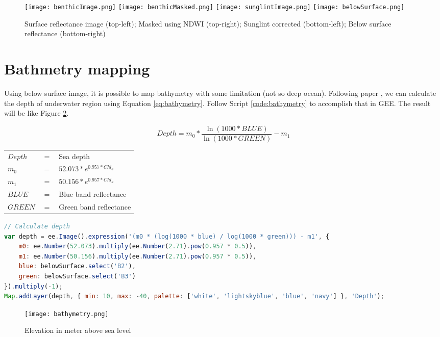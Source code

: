\begin{figure}[htbp]
	\label{fig:correction}
	\centering
	\texttt{[image: benthicImage.png]}
	\texttt{[image: benthicMasked.png]}
	\texttt{[image: sunglintImage.png]}
	\texttt{[image: belowSurface.png]}
	\caption{Surface reflectance image (top-left); Masked using NDWI (top-right); Sunglint corrected (bottom-left); Below surface reflectance (bottom-right)}
\end{figure}

\section{Bathmetry mapping}
Using below surface image, it is possible to map bathymetry with some limitation (not so deep ocean). Following paper \cite{li2021automated}, we can calculate the depth of underwater region using Equation \ref{eq:bathymetry}. Follow Script \ref{code:bathymetry} to accomplish that in GEE. The result will be like Figure \ref{fig:bathymetry}.

\begin{equation}
	\label{eq:bathymetry}
	Depth = m_0 * \frac{\ln(1000 * BLUE)}{\ln(1000 * GREEN)} - m_1
\end{equation}

\begin{tabular}{l l l}
	$Depth$ & $=$ & Sea depth \\
	$m_0$ & $=$ & $52.073 * e^{0.957 * Chl_a} $ \\
	$m_1$ & $=$ & $50.156 * e^{0.957 * Chl_a} $ \\
	$BLUE$ & $=$ & Blue band reflectance \\
	$GREEN$ & $=$ & Green band reflectance \\
\end{tabular}

\begin{lstlisting}[language=JavaScript, label={code:bathymetry}, caption={GEE script to map bathymetry}]
// Calculate depth
var depth = ee.Image().expression('(m0 * (log(1000 * blue) / log(1000 * green))) - m1', {
	m0: ee.Number(52.073).multiply(ee.Number(2.71).pow(0.957 * 0.5)),
	m1: ee.Number(50.156).multiply(ee.Number(2.71).pow(0.957 * 0.5)),
	blue: belowSurface.select('B2'),
	green: belowSurface.select('B3')
}).multiply(-1);
Map.addLayer(depth, { min: 10, max: -40, palette: ['white', 'lightskyblue', 'blue', 'navy'] }, 'Depth');
\end{lstlisting}

\begin{figure}[htbp]
	\label{fig:bathymetry}
	\centering
	\texttt{[image: bathymetry.png]}
	\caption{Elevation in meter above sea level}
\end{figure}

